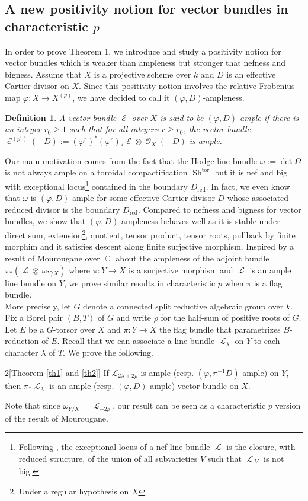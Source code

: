 \documentclass[11pt]{amsart}
\numberwithin{subsection}{section}
\numberwithin{figure}{section}
\numberwithin{table}{section}
\theoremstyle{1}
\newtheorem*{definition*}{Definition}
\theoremstyle{2}
\DeclareMathOperator{\C}{\mathbb{C}}
\DeclareMathOperator{\Sh}{Sh}
\DeclareMathOperator{\tor}{tor}
\DeclareMathOperator{\Lc}{\mathcal{L}}
\DeclareMathOperator{\E}{\mathcal{E}}
\DeclareMathOperator{\Oc}{\mathcal{O}}
\DeclareMathOperator{\red}{red}
\begin{document}
\subsection{A new positivity notion for vector bundles in characteristic $p$}\label{sect_pos_intro}
In order to prove Theorem 1, we introduce and study a positivity notion for vector bundles which is weaker than ampleness but stronger that nefness and bigness. Assume that $X$ is a projective scheme over $k$ and $D$ is an effective Cartier divisor on $X$. Since this positivity notion involves  the relative Frobenius map $\varphi : X \rightarrow X^{(p)}$, we have decided to call it $(\varphi,D)$-ampleness. 
\begin{definition*}
A vector bundle $\E$ over $X$ is said to be $(\varphi,D)$-ample if there is an integer $r_0 \geq 1$ such that for all integers $r \geq r_0$, the vector bundle $\E^{(p^r)}(-D) := {(\varphi^{r})}^{*}{(\varphi^{r})}_{*}\E \otimes \Oc_X(-D)$ is ample.
\end{definition*}
\vspace{0.2cm}
Our main motivation comes from the fact that the Hodge line bundle $\omega := \det \Omega$ is not always ample on a toroidal compactification $\Sh^{\tor}$ but it is nef and big with exceptional locus\footnote{Following \cite{keel1999basepoint}, the exceptional locus of a nef line bundle $\Lc$ is the closure, with reduced structure, of the union of all subvarieties $V$ such that $\Lc_{|V}$ is not big.} contained in the boundary $D_{\red}$. In fact, we even know that $\omega$ is $(\varphi,D)$-ample for some effective Cartier divisor $D$ whose associated reduced divisor is the boundary $D_{\red}$. Compared to nefness and bigness for vector bundles, we show that $(\varphi,D)$-ampleness behaves well as it is stable under direct sum, extension\footnote{Under a regular hypothesis on $X$}, quotient, tensor product, tensor roots, pullback by finite morphim and it satisfies descent along finite surjective morphism. Inspired by a result of Mourougane {\cite[Théorème 1]{MR1614576}} over $\C$ about the ampleness of the adjoint bundle $\pi_*(\Lc \otimes \ \omega_{Y/X})$ where $\pi : Y \rightarrow X$ is a surjective morphism and $\Lc$ is an ample line bundle on $Y$, we prove similar results in characteristic $p$ when $\pi$ is a flag bundle. \\

More precisely, let $G$ denote a connected split reductive algebraic group over $k$. Fix a Borel pair $(B,T)$ of $G$ and write $\rho$ for the half-sum of positive roots of $G$. Let $E$ be a $G$-torsor over $X$ and $\pi : Y \rightarrow X$ the flag bundle that parametrizes $B$-reduction of $E$. Recall that we can associate a line bundle $\Lc_{\lambda}$ on $Y$ to each character $\lambda$ of $T$. We prove the following.
\begin{customthm}{2}[Theorem \ref{th1} and \ref{th2}]
If $\mathcal{L}_{2\lambda+2\rho}$ is ample (resp. $(\varphi,\pi^{-1}D)$-ample) on $Y$, then $\pi_*\Lc_{\lambda}$ is an ample (resp. $(\varphi,D)$-ample) vector bundle on $X$.
\end{customthm}
\vspace{0.2cm}
Note that since $\omega_{Y/X} = \Lc_{-2\rho}$, our result can be seen as a characteristic $p$ version of the result of Mourougane. 
\end{document}
